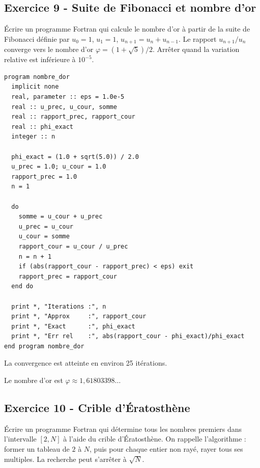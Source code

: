 \documentclass[12pt,a4paper]{article}
\begin{document}
\subsection*{Exercice 9 - Suite de Fibonacci et nombre d'or \niveau{\moyen}}

\begin{boiteexercice}
Écrire un programme Fortran qui calcule le nombre d'or à partir de la suite de Fibonacci définie par $u_0=1$, $u_1=1$, $u_{n+1}=u_n+u_{n-1}$. Le rapport $u_{n+1}/u_n$ converge vers le nombre d'or $\varphi = (1+\sqrt{5})/2$. Arrêter quand la variation relative est inférieure à $10^{-5}$.
\end{boiteexercice}

\begin{boitecorrige}
\begin{lstlisting}
program nombre_dor
  implicit none
  real, parameter :: eps = 1.0e-5
  real :: u_prec, u_cour, somme
  real :: rapport_prec, rapport_cour
  real :: phi_exact
  integer :: n

  phi_exact = (1.0 + sqrt(5.0)) / 2.0
  u_prec = 1.0; u_cour = 1.0
  rapport_prec = 1.0
  n = 1

  do
    somme = u_cour + u_prec
    u_prec = u_cour
    u_cour = somme
    rapport_cour = u_cour / u_prec
    n = n + 1
    if (abs(rapport_cour - rapport_prec) < eps) exit
    rapport_prec = rapport_cour
  end do

  print *, "Iterations :", n
  print *, "Approx     :", rapport_cour
  print *, "Exact      :", phi_exact
  print *, "Err rel    :", abs(rapport_cour - phi_exact)/phi_exact
end program nombre_dor
\end{lstlisting}

La convergence est atteinte en environ 25 itérations.

Le nombre d'or est $\varphi \approx 1{,}61803398\ldots$
\end{boitecorrige}

\subsection*{Exercice 10 - Crible d'Ératosthène \niveau{\moyen}}

\begin{boiteexercice}
Écrire un programme Fortran qui détermine tous les nombres premiers dans l'intervalle $[2, N]$ à l'aide du crible d'Ératosthène. On rappelle l'algorithme : former un tableau de $2$ à $N$, puis pour chaque entier non rayé, rayer tous ses multiples. La recherche peut s'arrêter à $\sqrt{N}$.
\end{boiteexercice}
\end{document}
